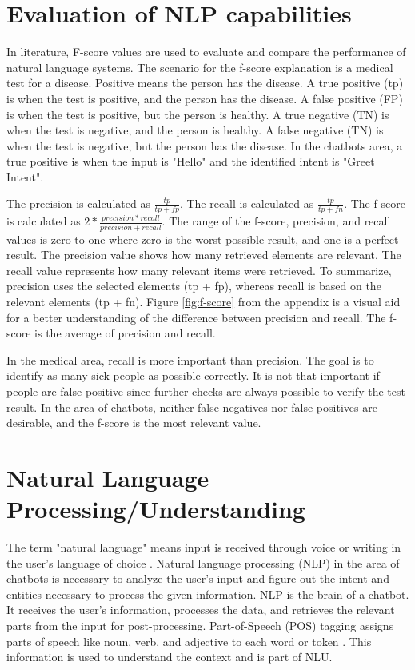 \section{Evaluation of NLP capabilities}
In literature, F-score values are used to evaluate and compare the performance of natural language systems.
The scenario for the f-score explanation is a medical test for a disease.
Positive means the person has the disease.
A true positive (tp) is when the test is positive, and the person has the disease.
A false positive (FP) is when the test is positive, but the person is healthy.
A true negative (TN) is when the test is negative, and the person is healthy.
A false negative (TN) is when the test is negative, but the person has the disease.
In the chatbots area, a true positive is when the input is "Hello" and the identified intent is "Greet Intent".

The precision is calculated as $\frac{tp}{tp + fp}$.
The recall is calculated as $\frac{tp}{tp + fn}$.
The f-score is calculated as $2 * \frac{precision * recall}{precision + recall}$.
The range of the f-score, precision, and recall values is zero to one where zero is the worst possible result, and one is a perfect result.
The precision value shows how many retrieved elements are relevant.
The recall value represents how many relevant items were retrieved.
To summarize, precision uses the selected elements (tp + fp), whereas recall is based on the relevant elements (tp + fn).
Figure \ref{fig:f-score} from the appendix is a visual aid for a better understanding of the difference between precision and recall.
The f-score is the average of precision and recall.

In the medical area, recall is more important than precision.
The goal is to identify as many sick people as possible correctly.
It is not that important if people are false-positive since further checks are always possible to verify the test result.
In the area of chatbots, neither false negatives nor false positives are desirable, and the f-score is the most relevant value.


\section{Natural Language Processing/Understanding}   
The term "natural language" means input is received through voice or writing in the user's language of choice \cite{buiildChatbotsPython}.
Natural language processing (NLP) in the area of chatbots is necessary to analyze the user's input and figure out the intent and entities necessary to process the given information. 
NLP is the brain of a chatbot.
It receives the user's information, processes the data, and retrieves the relevant parts from the input for post-processing.
Part-of-Speech (POS) tagging assigns parts of speech like noun, verb, and adjective to each word or token \cite{buiildChatbotsPython}.
This information is used to understand the context and is part of NLU.

